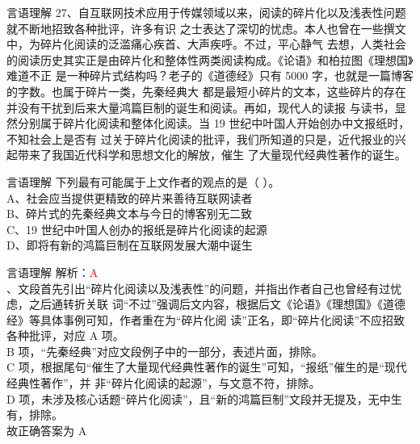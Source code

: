 \documentclass[aspectratio=169]{beamer}
\begin{document}
\begin{frame}[t]{言语理解}
27、自互联网技术应用于传媒领域以来，阅读的碎片化以及浅表性问题就不断地招致各种批评，许多有识
之士表达了深切的忧虑。本人也曾在一些撰文中，为碎片化阅读的泛滥痛心疾首、大声疾呼。不过，平心静气
去想，人类社会的阅读历史其实正是由碎片化和整体性两类阅读构成。《论语》和柏拉图《理想国》难道不正
是一种碎片式结构吗？老子的《道德经》只有 5000 字，也就是一篇博客的字数。也属于碎片一类，先秦经典大
都是最短小碎片的文本，这些碎片的存在并没有干扰到后来大量鸿篇巨制的诞生和阅读。再如，现代人的读报
与读书，显然分别属于碎片化阅读和整体化阅读。当 19 世纪中叶国人开始创办中文报纸时，不知社会上是否有
过关于碎片化阅读的批评，我们所知道的只是，近代报业的兴起带来了我国近代科学和思想文化的解放，催生
了大量现代经典性著作的诞生。\\
\end{frame}




\begin{frame}[t]{言语理解}
下列最有可能属于上文作者的观点的是（ ）。\\
A、社会应当提供更精致的碎片来善待互联网读者\\
B、碎片式的先秦经典文本与今日的博客别无二致\\
C、19 世纪中叶国人创办的报纸是碎片化阅读的起源\\
D、即将有新的鸿篇巨制在互联网发展大潮中诞生\\
\end{frame}


\begin{frame}[t]{言语理解}
    解析：\textcolor{red}{A}\\
    、文段首先引出“碎片化阅读以及浅表性”的问题，并指出作者自己也曾经有过忧虑，之后通转折关联
词“不过”强调后文内容，根据后文《论语》《理想国》《道德经》等具体事例可知，作者重在为“碎片化阅
读”正名，即“碎片化阅读”不应招致各种批评，对应 A 项。\\
B 项，“先秦经典”对应文段例子中的一部分，表述片面，排除。\\
C 项，根据尾句“催生了大量现代经典性著作的诞生”可知，“报纸”催生的是“现代经典性著作”，并
非“碎片化阅读的起源”，与文意不符，排除。\\
D 项，未涉及核心话题“碎片化阅读”，且“新的鸿篇巨制”文段并无提及，无中生有，排除。\\
故正确答案为 A\\
\end{frame}
\end{document}
